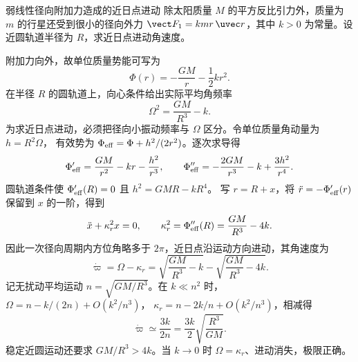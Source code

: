 \begin{origexamplebox}{弱线性径向附加力造成的近日点进动}
\label{ch11:ex:07}
除太阳质量 $M$ 的平方反比引力外，质量为 $m$ 的行星还受到很小的径向外力
$\vect F_1=kmr\,\uvec r$，其中 $k>0$ 为常量。设近圆轨道半径为 $R$，求近日点进动角速度。
\end{origexamplebox}
\begin{xesolution}
附加力向外，故单位质量势能可写为
\[
 \Phi(r)=-\frac{GM}{r}-\frac12kr^2.
\]
在半径 $R$ 的圆轨道上，向心条件给出实际平均角频率
\[
 \boxed{\Omega^2=\frac{GM}{R^3}-k}.
\]
为求近日点进动，必须把径向小振动频率与 $\Omega$ 区分。令单位质量角动量为 $h=R^2\Omega$，
有效势为 $\Phi_{\rm eff}=\Phi+h^2/(2r^2)$。逐次求导得
\[
 \Phi_{\rm eff}'=\frac{GM}{r^2}-kr-\frac{h^2}{r^3},\qquad
 \Phi_{\rm eff}''=-\frac{2GM}{r^3}-k+\frac{3h^2}{r^4}.
\]
圆轨道条件使 $\Phi_{\rm eff}'(R)=0$ 且 $h^2=GMR-kR^4$。
写 $r=R+x$，将 $\ddot r=-\Phi_{\rm eff}'(r)$ 保留到 $x$ 的一阶，得到
\[
 \ddot x+\kappa_r^2x=0,
 \qquad
 \kappa_r^2=\Phi_{\rm eff}''(R)
 =\frac{GM}{R^3}-4k.
\]
因此一次径向周期内方位角略多于 $2\pi$，近日点沿运动方向进动，其角速度为
\[
 \boxed{\dot\varpi=\Omega-\kappa_r
 =\sqrt{\frac{GM}{R^3}-k}
 -\sqrt{\frac{GM}{R^3}-4k}}.
\]
记无扰动平均运动 $n=\sqrt{GM/R^3}$。在 $k\ll n^2$ 时，
$\Omega=n-k/(2n)+O(k^2/n^3)$，
$\kappa_r=n-2k/n+O(k^2/n^3)$，相减得
\[
 \boxed{\dot\varpi\simeq\frac{3k}{2n}
 =\frac{3k}{2}\sqrt{\frac{R^3}{GM}}}.
\]
稳定近圆运动还要求 $GM/R^3>4k$。当 $k\to0$ 时 $\Omega=\kappa_r$、进动消失，极限正确。
\end{xesolution}

